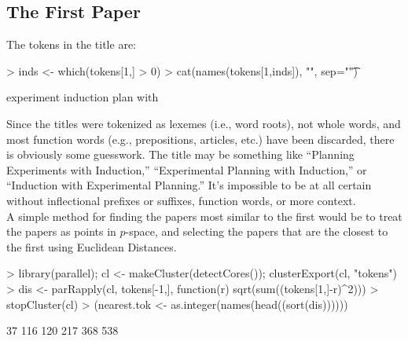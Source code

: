 \documentclass[a4paper]{article}
\begin{document}
\subsection{The First Paper}
The tokens in the title are:
\begin{Schunk}
\begin{Sinput}
> inds <- which(tokens[1,] > 0)
> cat(names(tokens[1,inds]), "\n", sep="\t")
\end{Sinput}
\begin{Soutput}
experiment	induction	plan	with	
\end{Soutput}
\end{Schunk}
Since the titles were tokenized as lexemes (i.e., word roots), not
whole words, and most function words (e.g., prepositions, articles, etc.) have
been discarded, there is obviously some
guesswork.  The title may be something like ``Planning Experiments with
Induction,'' ``Experimental Planning with Induction,'' or ``Induction
with Experimental Planning.''  It's impossible to be at all certain
without inflectional prefixes or suffixes, function words, or more
context.\\

A simple method for finding the papers most similar to the first
would be to treat the papers as points in $p$-space, and selecting the
papers that are the closest to the first using Euclidean Distances.\\

\begin{Schunk}
\begin{Sinput}
> library(parallel); cl <- makeCluster(detectCores()); clusterExport(cl, "tokens")
> dis <- parRapply(cl, tokens[-1,], function(r) sqrt(sum((tokens[1,]-r)^2)))
> stopCluster(cl)
> (nearest.tok <- as.integer(names(head((sort(dis))))))
\end{Sinput}
\begin{Soutput}
[1]  37 116 120 217 368 538
\end{Soutput}
\end{Schunk}
\end{document}
